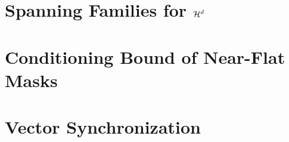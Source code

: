 \chapter{Spanning Families for $\mathcal{H}^d$}
\label{app:gam_span_herm}

\chapter{Conditioning Bound of Near-Flat Masks}
\label{app:nearflat_more}

\chapter{Vector Synchronization}
\label{app:vec_sync}

